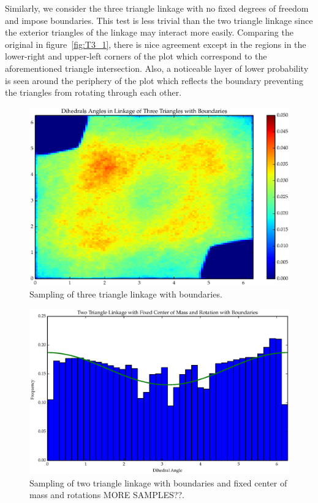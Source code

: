 Similarly, we consider the three triangle linkage with no fixed degrees of freedom and impose boundaries. This test is less trivial than the two triangle linkage since the exterior triangles of the linkage may interact more easily. Comparing the original in figure~\ref{fig:T3_1}, there is nice agreement except in the regions in the lower-right and upper-left corners of the plot which correspond to the aforementioned triangle intersection. Also, a noticeable layer of lower probability is seen around the periphery of the plot which reflects the boundary preventing the triangles from rotating through each other.
\begin{figure}[ht]
\label{fig:T3_2}
\centering
  \includegraphics[scale=0.6]{images/T3_2_2D.eps}
\caption{Sampling of three triangle linkage with boundaries.}
\end{figure}


\begin{figure}[ht]
\label{fig:T2_6}
\centering
  \includegraphics[scale=0.6]{images/T2_6.eps}
\caption{Sampling of two triangle linkage with boundaries and fixed center of mass and rotations MORE SAMPLES??.}
\end{figure}

